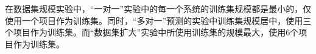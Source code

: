 
在数据集规模实验中，“一对一”实验中的每一个系统的训练集规模都是最小的，仅使用一个项目作为训练集。同时，“多对一”预测的实验中训练集规模居中，使用三个项目作为训练集。而“数据集扩大”实验中所使用训练集的规模最大，使用6个项目作为训练集。


